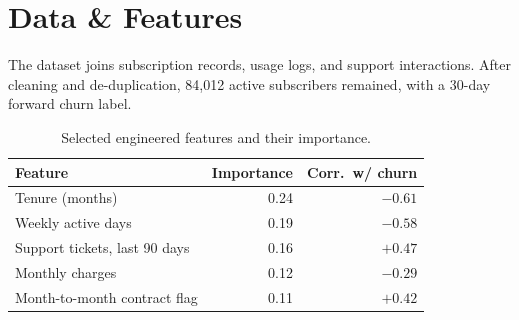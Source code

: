 \section{Data \& Features}
The dataset joins subscription records, usage logs, and support interactions. After cleaning
and de-duplication, 84,012 active subscribers remained, with a 30-day forward churn label.

\begin{table}[ht]\centering
\caption{Selected engineered features and their importance.}
\begin{tabularx}{\linewidth}{@{}X r r@{}}
\toprule
\textbf{Feature} & \textbf{Importance} & \textbf{Corr.\ w/ churn}\\
\midrule
Tenure (months)              & 0.24 & $-0.61$\\
Weekly active days           & 0.19 & $-0.58$\\
Support tickets, last 90 days & 0.16 & $+0.47$\\
Monthly charges              & 0.12 & $-0.29$\\
Month-to-month contract flag & 0.11 & $+0.42$\\
\bottomrule
\end{tabularx}
\end{table}
